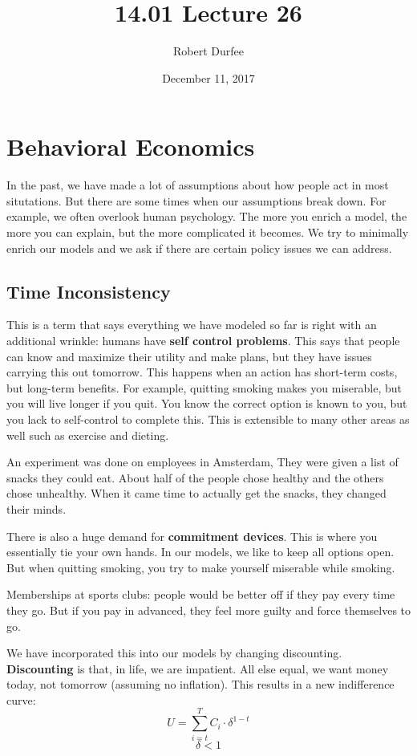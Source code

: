 \documentclass{article}
\title{ 14.01 Lecture 26 }
\author{ Robert Durfee }
\date{ December 11, 2017 }
\begin{document}
\maketitle

\section{ Behavioral Economics }

In the past, we have made a lot of assumptions about how people act in most
situtations. But there are some times when our assumptions break down. For
example, we often overlook human psychology. The more you enrich a model, the
more you can explain, but the more complicated it becomes. We try to minimally
enrich our models and we ask if there are certain policy issues we can address.

\subsection{Time Inconsistency}

This is a term that says everything we have modeled so far is right with an
additional wrinkle: humans have \textbf{self control problems}. This says that
people can know and maximize their utility and make plans, but they have issues
carrying this out tomorrow. This happens when an action has short-term costs,
but long-term benefits. For example, quitting smoking makes you miserable, but
you will live longer if you quit. You know the correct option is known to you,
but you lack to self-control to complete this. This is extensible to many other
areas as well such as exercise and dieting. 

An experiment was done on employees in Amsterdam, They were given a list of
snacks they could eat. About half of the people chose healthy and the others
chose unhealthy. When it came time to actually get the snacks, they changed
their minds.

There is also a huge demand for \textbf{commitment devices}. This is where you
essentially tie your own hands. In our models, we like to keep all options open.
But when quitting smoking, you try to make yourself miserable while smoking. 

Memberships at sports clubs: people would be better off if they pay every time
they go. But if you pay in advanced, they feel more guilty and force themselves
to go. 

We have incorporated this into our models by changing discounting.
\textbf{Discounting} is that, in life, we are impatient. All else equal, we want
money today, not tomorrow (assuming no inflation). This results in a new
indifference curve:
$$ U = \sum_{i = t}^{T} C_{i} \cdot \delta^{1 - t} $$
$$ \delta < 1 $$
\end{document}
